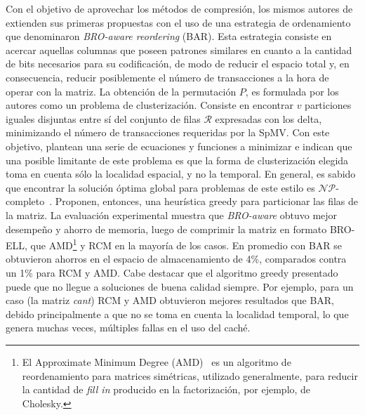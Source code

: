 Con el objetivo de aprovechar los métodos de compresión, los mismos autores de~\cite{Tang2013} extienden sus primeras propuestas con el uso de una estrategia de ordenamiento que denominaron \textit{BRO-aware reordering} (BAR). Esta estrategia consiste en acercar aquellas columnas que poseen patrones similares en cuanto a la cantidad de bits necesarios para su codificación, de modo de reducir el espacio total y, en consecuencia, reducir posiblemente el número de transacciones a la hora de operar con la matriz. La obtención de la permutación $P$, es formulada por los autores como un problema de clusterización. Consiste en encontrar $v$ particiones iguales disjuntas entre sí del conjunto de filas $\mathcal{R}$ expresadas con los delta, minimizando el número de transacciones requeridas por la SpMV. Con este objetivo, plantean una serie de ecuaciones y funciones a minimizar e indican que una posible limitante de este problema es que la forma de clusterización elegida toma en cuenta sólo la localidad espacial, y no la temporal. En general, es sabido que encontrar la solución óptima global para problemas de este estilo es $\mathcal{NP}$-completo~\cite{Jain2010}. Proponen, entonces, una heurística greedy para particionar las filas de la matriz. 
La evaluación experimental muestra que \textit{BRO-aware} obtuvo mejor desempeño y ahorro de memoria, luego de comprimir la matriz en formato BRO-ELL, que AMD\footnote{El Approximate Minimum Degree (AMD)~\cite{George1989} es un algoritmo de reordenamiento para matrices simétricas, utilizado generalmente, para reducir la cantidad de \textit{fill in} producido en la factorización, por ejemplo, de Cholesky.} y RCM en la mayoría de los casos. 
En promedio con BAR se obtuvieron ahorros en el espacio de almacenamiento de 4\%, comparados contra un 1\% para RCM y AMD. Cabe destacar que el algoritmo greedy presentado puede que no llegue a soluciones de buena calidad siempre. Por ejemplo, para un caso (la matriz \textit{cant}) RCM y AMD obtuvieron mejores resultados que BAR, debido principalmente a que no se toma en cuenta la localidad temporal, lo que genera muchas veces, múltiples fallas en el uso del caché.


